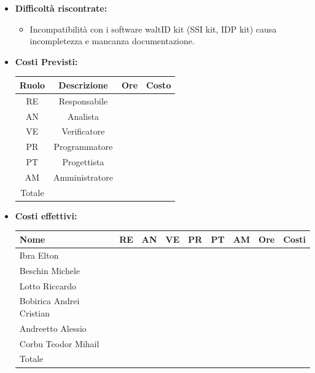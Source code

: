 \begin{itemize}
\begin{itemize}
        \end{itemize}
        \item \textbf{Difficoltà riscontrate:}
        \begin{itemize}
            \item Incompatibilità con i software waltID kit (SSI kit, IDP kit) causa incompletezza e mancanza documentazione.
        \end{itemize}
        \item \textbf{Costi Previsti:}
        \begin{longtable}{|c|c|c|c|}
            \hline
            Ruolo & Descrizione & Ore & Costo \\
            \hline
            RE & Responsabile &  &  \\
            \hline
            AN & Analista &  &  \\
            \hline
            VE & Verificatore &  &  \\
            \hline
            PR & Programmatore &  &  \\
            \hline
            PT & Progettista &  &  \\
            \hline
            AM & Amministratore &  &  \\
            \hline
            Totale & &  &  \\
            \hline
            \end{longtable}
        \item \textbf{Costi effettivi:}
        \begin{longtable}{|p{}|c|c|c|c|c|c|c|c|}
            \hline
            Nome & RE & AN & VE & PR & PT & AM & Ore & Costi\\
            \hline
            Ibra \newline Elton & & & & & & & & \\
            \hline
            Beschin Michele & & & & & & & & \\
            \hline
            Lotto \newline Riccardo & & & & & & & & \\
            \hline
            Bobirica Andrei Cristian & & & & & & & & \\
            \hline
            Andreetto Alessio & & & & & & & & \\
            \hline
            Corbu Teodor Mihail & & & & & & & & \\
            \hline
            Totale & & & & & & & & \\
            \hline
        \end{longtable}
        \end{itemize}

